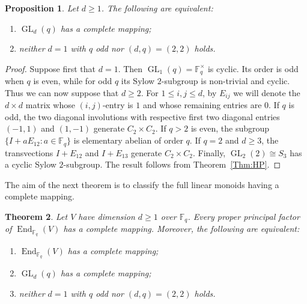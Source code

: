 \documentclass[11pt]{article}
\theoremstyle{plain}
\newtheorem{theorem}{Theorem}[section]
\newtheorem{prop}[theorem]{Proposition}
\theoremstyle{remark}
\theoremstyle{definition}
\theoremstyle{plain}
\newcommand{\End}{\mathop{\mathrm{End}}}
\begin{document}
\begin{prop}\label{p:linear-group-complete}
Let $d\ge1$. The following are equivalent:
\begin{enumerate}
\item $\operatorname{GL}_d(q)$ has a complete mapping;
\item neither $d=1$ with $q$ odd nor $(d,q)=(2,2)$ holds.
\end{enumerate}
\end{prop}

\begin{proof}
Suppose first that $d=1$. Then
$\operatorname{GL}_1(q)=\mathbb F_q^\times$ is cyclic. Its order is odd when
$q$ is even, while for odd $q$ its Sylow $2$-subgroup is non-trivial and
cyclic. Thus we can now suppose that $d\ge2$. For $1\le i,j\le d$, by
$E_{ij}$ we will denote the $d\times d$ matrix whose $(i,j)$-entry is $1$
and whose remaining entries are $0$. If $q$ is odd, the two diagonal
involutions with respective first two diagonal entries $(-1,1)$ and
$(1,-1)$ generate $C_2\times C_2$. If $q>2$ is even, the subgroup
$\{I+aE_{12}:a\in\mathbb F_q\}$ is elementary abelian of order $q$. If
$q=2$ and $d\ge3$, the transvections $I+E_{12}$ and $I+E_{13}$ generate
$C_2\times C_2$. Finally, $\operatorname{GL}_2(2)\cong S_3$ has a cyclic
Sylow $2$-subgroup. The result follows from Theorem~\ref{Thm:HP}. 
\end{proof}

The aim of the next theorem is to classify the full linear monoids having a
complete mapping.

\begin{theorem}\label{t:linear-monoid}
Let $V$ have dimension $d\ge1$ over $\mathbb F_q$. Every proper
principal factor of $\End_{\mathbb F_q}(V)$ has a complete mapping. Moreover,
the following are equivalent:
\begin{enumerate}
\item $\End_{\mathbb F_q}(V)$ has a complete mapping;
\item $\operatorname{GL}_d(q)$ has a complete mapping;
\item neither $d=1$ with $q$ odd nor $(d,q)=(2,2)$ holds.
\end{enumerate}
\end{theorem}
\end{document}
